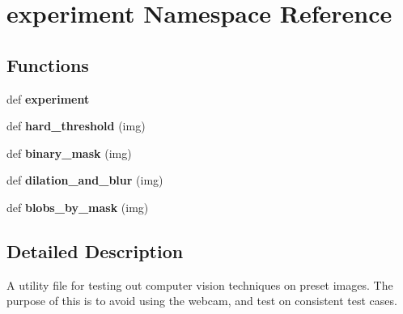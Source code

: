 \hypertarget{namespaceexperiment}{}\section{experiment Namespace Reference}
\label{namespaceexperiment}
\subsection*{Functions}
\begin{DoxyCompactItemize}
\item 
\hypertarget{namespaceexperiment_afd7cadc0db62c738ec5313cac9cd03e5}{}def {\bfseries experiment}\label{namespaceexperiment_afd7cadc0db62c738ec5313cac9cd03e5}

\item 
\hypertarget{namespaceexperiment_aeac24644877a02c335d201812ba51625}{}def {\bfseries hard\+\_\+threshold} (img)\label{namespaceexperiment_aeac24644877a02c335d201812ba51625}

\item 
\hypertarget{namespaceexperiment_afbfd0da7a229ea75fe6eda26e04a344a}{}def {\bfseries binary\+\_\+mask} (img)\label{namespaceexperiment_afbfd0da7a229ea75fe6eda26e04a344a}

\item 
\hypertarget{namespaceexperiment_aad51fba16bbd81e9a968249d747958b3}{}def {\bfseries dilation\+\_\+and\+\_\+blur} (img)\label{namespaceexperiment_aad51fba16bbd81e9a968249d747958b3}

\item 
\hypertarget{namespaceexperiment_a26994eacbd1a8bf004fc3477c8164daf}{}def {\bfseries blobs\+\_\+by\+\_\+mask} (img)\label{namespaceexperiment_a26994eacbd1a8bf004fc3477c8164daf}

\end{DoxyCompactItemize}


\subsection{Detailed Description}
\begin{DoxyVerb}A utility file for testing out computer vision techniques on preset images.
The purpose of this is to avoid using the webcam, and test on consistent test
cases.
\end{DoxyVerb}
 